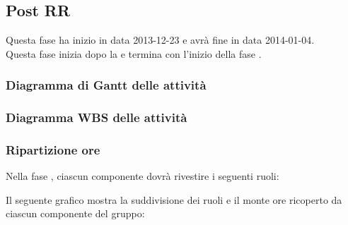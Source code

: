 \subsection{Post RR}
Questa fase ha inizio in data 2013-12-23 e avrà fine in data 2014-01-04.\\
Questa fase inizia dopo la  e termina con l'inizio della fase .

\subsubsection{Diagramma di Gantt delle attività}

\newpage
\subsubsection{Diagramma WBS delle attività}

\newpage
\subsubsection{Ripartizione ore}

\newpage
Nella fase , ciascun componente dovrà rivestire i seguenti ruoli:

Il seguente grafico mostra la suddivisione dei ruoli e il monte ore ricoperto da ciascun componente del gruppo:
